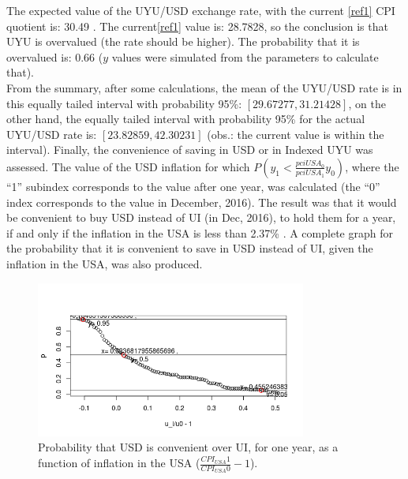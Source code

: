 \documentclass[a4paper,12pt]{article}
\begin{document}
The expected value of the UYU/USD exchange rate, with the current \cref{ref1} CPI quotient is: 30.49 . The current\cref{ref1} value is: 28.7828, so the conclusion is that UYU is overvalued (the rate should be higher). The probability that it is overvalued is: 0.66 ($y$ values were simulated from the parameters to calculate that).\\
From the summary, after some calculations, the mean of the UYU/USD rate is in this equally tailed interval with probability 95\%: $[29.67277, 31.21428]$, on the other hand, the equally tailed interval with probability 95\% for the actual UYU/USD rate is: $[23.82859, 42.30231]$ (obs.: the current value is within the interval). Finally, the convenience of saving in USD or in Indexed UYU was assessed. The value of the USD inflation for which $P(y_1 < \frac{pciUSA_0}{pciUSA_1}y_0)$, where the ``1'' subindex corresponds to the value after one year, was calculated (the ``0'' index corresponds to the value in December, 2016). The result was that it would be convenient to buy USD instead of UI (in Dec, 2016), to hold them for a year, if and only if the inflation in the USA is less than 2.37\% . A complete graph for the probability that it is convenient to save in USD instead of UI, given the inflation in the USA, was also produced.

\begin{figure}[!h]
\centering
\includegraphics[width=3.5in]{images/i008_inflation.png}
\caption{Probability that USD is convenient over UI, for one year, as a function of inflation in the USA ($\frac{CPI_{USA}1}{CPI_{USA}0} - 1$).}
\label{fig_raw_data}
\end{figure}
\end{document}
